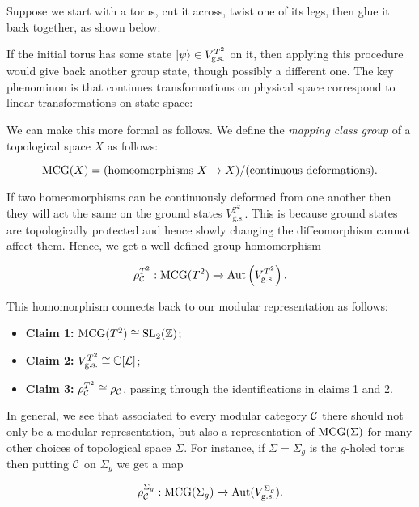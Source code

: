 Suppose we start with a torus, cut it across, twist one of its legs, then glue it back together, as shown below:


If the initial torus has some state $\ket{\psi}\in V_{\text{g.s.}}^{T^2}$ on it, then applying this procedure would give back another group state, though possibly a different one. The key phenominon is that continues transformations on physical space correspond to linear transformations on state space:


We can make this more formal as follows. We define the \textit{mapping class group} of a topological space $X$ as follows:

$$\operatorname{MCG}(X)=(\text{homeomorphisms $X\to X$})/(\text{continuous deformations}).$$

If two homeomorphisms can be continuously deformed from one another then they will act the same on the ground states $V_{\text{g.s.}}^{T^2}$. This is because ground states are topologically protected and hence slowly changing the diffeomorphism cannot affect them. Hence, we get a well-defined group homomorphism

$$\rho_{{\mathcal C}}^{T^2}:\operatorname{MCG}(T^2)\xrightarrow{}\operatorname{Aut}\left(V_{\text{g.s.}}^{T^2}\right).$$

This homomorphism connects back to our modular representation as follows:

\begin{itemize}
\item \textbf{Claim 1:} $\operatorname{MCG}(T^2)\cong \operatorname{SL}_2({\mathbb Z})$;

\item \textbf{Claim 2:} $V_{\text{g.s.}}^{T^2}\cong {\mathbb C}[{\mathcal L}]$;

\item \textbf{Claim 3:} $\rho_{{\mathcal C}}^{T^2}\cong \rho_{{\mathcal C}}$, passing through the identifications in claims 1 and 2.
\end{itemize}

In general, we see that associated to every modular category ${\mathcal C}$ there should not only be a modular representation, but also a representation of $\operatorname{MCG}(\Sigma)$ for many other choices of topological space $\Sigma$. For instance, if $\Sigma=\Sigma_g$ is the $g$-holed torus then putting ${\mathcal C}$ on $\Sigma_g$ we get a map

$$\rho_{{\mathcal C}}^{\Sigma_g}:\operatorname{MCG}(\Sigma_g)\xrightarrow{}\operatorname{Aut}(V_{\text{g.s.}}^{\Sigma_g}).$$


